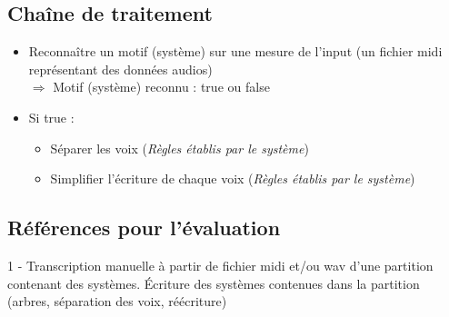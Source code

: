 \subsection*{Chaîne de traitement}
\begin{itemize}
	\item Reconnaître un motif (système) sur une mesure de l’input (un fichier midi représentant des données audios)\\ $\Rightarrow$ Motif (système) reconnu : true ou false
	\item Si true : 
	\begin{itemize}
		\item Séparer les voix (\textit{Règles établis par le système})
		\item Simplifier l’écriture de chaque voix (\textit{Règles établis par le système})\\
	\end{itemize}
\end{itemize}

\subsection*{Références pour l’évaluation}
1 - Transcription manuelle à partir de fichier midi et/ou wav d’une partition contenant des systèmes. Écriture des systèmes contenues dans la partition (arbres, séparation des voix, réécriture)